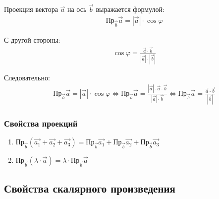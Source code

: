 \documentclass[12pt, fleqn]{extarticle}
\begin{document}
Проекция вектора \(\overrightarrow{a}\) на ось \(\overrightarrow{b}\) выражается формулой:
\begin{align*}
     &  &
    \text{Пр}_{\overrightarrow{b}}\overrightarrow{a} = |\overrightarrow{a}| \cdot \cos{\varphi}
\end{align*}

С другой стороны:
\begin{align*}
     &  &
    \cos{\varphi} = \frac{\overrightarrow{a} \cdot \overrightarrow{b}}{|\overrightarrow{a}| \cdot |\overrightarrow{b}|}
\end{align*}

Следовательно:
\begin{align*}
     &  &
    \text{Пр}_{\overrightarrow{b}}\overrightarrow{a} = |\overrightarrow{a}| \cdot \cos{\varphi} \iff
    \text{Пр}_{\overrightarrow{b}}\overrightarrow{a} = \frac{|\overrightarrow{a}| \cdot \overrightarrow{a} \cdot \overrightarrow{b}}{|\overrightarrow{a}| \cdot \overrightarrow{b}} \iff
    \text{Пр}_{\overrightarrow{b}}\overrightarrow{a} =
    \frac{\overrightarrow{a} \cdot \overrightarrow{b}}{|\overrightarrow{b}|}
\end{align*}

\subsubsection*{Свойства проекций}
\begin{enumerate}
    \item {
          \(    \text{Пр}_{\overrightarrow{b}}(\overrightarrow{a_1} + \overrightarrow{a_2} + \overrightarrow{a_3}) =
          \text{Пр}_{\overrightarrow{b}}\overrightarrow{a_1} +
          \text{Пр}_{\overrightarrow{b}}\overrightarrow{a_2} +
          \text{Пр}_{\overrightarrow{b}}\overrightarrow{a_3}
          \)
          }
    \item {
          \(
          \text{Пр}_{\overrightarrow{b}}(\lambda \cdot \overrightarrow{a}) = \lambda \cdot \text{Пр}_{\overrightarrow{b}}\overrightarrow{a}
          \)
          }
\end{enumerate}

\subsection*{Свойства скалярного произведения}
\end{document}
